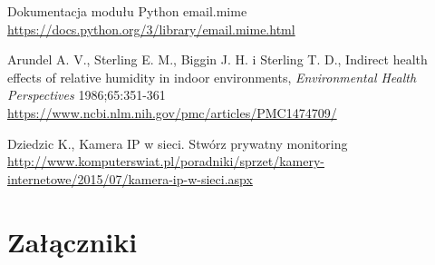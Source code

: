 \documentclass[a4paper,12pt,twoside]{article}
\begin{document}
\begin{thebibliography}{9}
Dokumentacja modułu Python email.mime
\url{https://docs.python.org/3/library/email.mime.html}

Arundel A. V., Sterling E. M., Biggin J. H. i Sterling T. D., Indirect health effects of relative humidity in indoor environments, \textit{Environmental Health Perspectives} 1986;65:351-361
\url{https://www.ncbi.nlm.nih.gov/pmc/articles/PMC1474709/}

Dziedzic K., Kamera IP w sieci. Stwórz prywatny monitoring
\url{http://www.komputerswiat.pl/poradniki/sprzet/kamery-internetowe/2015/07/kamera-ip-w-sieci.aspx}

\end{thebibliography}

\newpage
\section{Załączniki}
\end{document}
